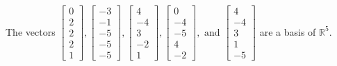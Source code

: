 \begin{exercise}
\begin{exerciseStatement}
  \end{exerciseStatement}
  \begin{exerciseAnswer}
   The vectors \(\left[\begin{array}{r}
0 \\
2 \\
2 \\
2 \\
1
\end{array}\right] , \left[\begin{array}{r}
-3 \\
-1 \\
-5 \\
-5 \\
-5
\end{array}\right] , \left[\begin{array}{r}
4 \\
-4 \\
3 \\
-2 \\
1
\end{array}\right] , \left[\begin{array}{r}
0 \\
-4 \\
-5 \\
4 \\
-2
\end{array}\right] , \text{ and } \left[\begin{array}{r}
4 \\
-4 \\
3 \\
1 \\
-5
\end{array}\right]\) 
  	 are  a basis of \(\mathbb{R}^5\).
  


  \end{exerciseAnswer}
\end{exercise}